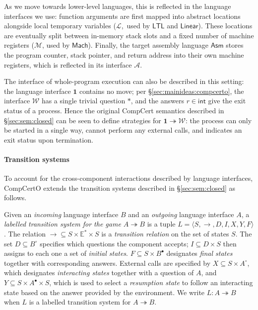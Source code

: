 \documentclass[acmsmall,screen,review,anonymous]{acmart}
\newcommand{\kw}[1]{\ensuremath{ \mathsf{#1} }}
\newcommand{\que}{\circ}
\newcommand{\ans}{\bullet}
\begin{document}
As we move towards lower-level languages,
this is reflected in the language interfaces we use:
function arguments are first mapped into
abstract locations alongside local temporary variables
($\mathcal{L}$,~used by \kw{LTL} and \kw{Linear}).
These locations are eventually split between
in-memory stack slots and a fixed number of machine registers
($\mathcal{M}$, used by \kw{Mach}).
Finally, the target assembly language \kw{Asm}
stores the program counter, stack pointer,
and return address into their own machine registers,
which is reflected in its interface $\mathcal{A}$.

The interface of whole-program execution
can also be described in this setting:
the language interface $\mathbf{1}$ contains no move;
per \S\ref{sec:mainideas:compcerto},
the interface $\mathcal{W}$ has a single trivial question $*$,
and the answers $r \in \kw{int}$
give the exit status of a process.
Hence the original CompCert semantics described in
\S\ref{sec:sem:closed}
can be seen to define strategies for
$\mathbf{1} \twoheadrightarrow \mathcal{W}$:
the process can only be started in a single way,
cannot perform any external calls,
and indicates an exit status upon termination.


\paragraph{Transition systems} %

To account for the cross-component interactions
described by language interfaces,
CompCertO extends
the transition systems described in \S\ref{sec:sem:closed}
as follows.

\begin{definition} \label{def:lts}
Given an \emph{incoming} language interface $B$
and an \emph{outgoing} language interface $A$,
a \emph{labelled transition system for the game $A \twoheadrightarrow B$}
is a tuple $L = \langle S, \rightarrow, D, I, X, Y, F \rangle$.
The relation
${\rightarrow} \subseteq S \times \mathbb{E}^* \times S$ is
a \emph{transition relation} on the set of states $S$.
The set $D \subseteq B^\que$ specifies which
questions the component accepts;
$I \subseteq D \times S$ then
assigns to each one a set of \emph{initial states}.
$F \subseteq S \times B^\ans$
designates \emph{final states} together with corresponding answers.
External calls are specified by
$X \subseteq S \times A^\que$,
which designates \emph{interacting states} together with
a question of $A$, and
$Y \subseteq S \times A^\ans \times S$,
which is used to select a \emph{resumption state}
to follow an interacting state
based on the answer provided by the environment.
We write $L : A \twoheadrightarrow B$ when
$L$ is a labelled transition system for $A \twoheadrightarrow B$.
\end{definition}
\end{document}
